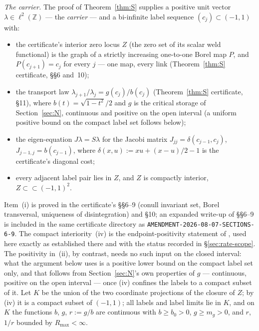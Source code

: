 \documentclass[11pt]{article}
\theoremstyle{remark}
\begin{document}
\emph{The carrier.} The proof of Theorem~\ref{thm:S} supplies a positive
unit vector $\lambda\in\ell^2(\mathbb{Z})$ --- the \emph{carrier} --- and
a bi-infinite label sequence $(c_j)\subset(-1,1)$ with:
\begin{itemize}
\item[(i)] the certificate's interior zero locus $Z$ (the zero set of its
scalar weld functional) is the graph of a strictly increasing one-to-one
Borel map $P$, and $P(c_{j+1})=c_j$ for every $j$ --- one map, every link
(Theorem~\ref{thm:S} certificate, \S\S6 and~10);
\item[(ii)] the transport law $\lambda_{j+1}/\lambda_j = g(c_j)/b(c_j)$
(Theorem~\ref{thm:S} certificate, \S11), where $b(t)=\sqrt{1-t^2}/2$ and $g$ is the critical
storage of Section~\ref{sec:N}, continuous and positive on the open
interval (a uniform positive bound on the compact label set follows
below);
\item[(iii)] the eigen-equation $J\lambda=S\lambda$ for the Jacobi matrix
$J_{jj}=\delta(c_{j-1},c_j)$, $J_{j-1,j}=b(c_{j-1})$, where
$\delta(x,u):=xu+(x-u)/2-1$ is the certificate's diagonal cost;
\item[(iv)] every adjacent label pair lies in $Z$, and $Z$ is compactly
interior, $Z\subset\subset(-1,1)^2$.
\end{itemize}
Item~(i) is proved in the certificate's \S\S6--9 (conull invariant set,
Borel transversal, uniqueness of disintegration) and \S10; an expanded
write-up of \S\S6--9 is included in the same certificate directory as
\texttt{AMENDMENT-2026-08-07-SECTIONS-6-9}. The compact interiority~(iv)
is the endpoint-positivity statement of \cite{Repo}, used here exactly as
established there and with the status recorded in
\S\ref{sec:rate-scope}. The positivity in~(ii), by contrast, needs no
such input on the closed interval: what the argument below uses is a
positive lower bound on the compact label set only, and that follows
from Section~\ref{sec:N}'s own properties of $g$ --- continuous,
positive on the open interval --- once (iv) confines the labels to a
compact subset of it. Let $K$ be the union of the two coordinate
projections of the closure of $Z$; by (iv) it is a compact subset of
$(-1,1)$;
all labels and label limits lie in $K$, and on $K$ the functions $b$,
$g$, $r:=g/b$ are continuous with $b\ge b_0>0$, $g\ge m_g>0$, and $r$,
$1/r$ bounded by $R_{\max}<\infty$.
\end{document}
